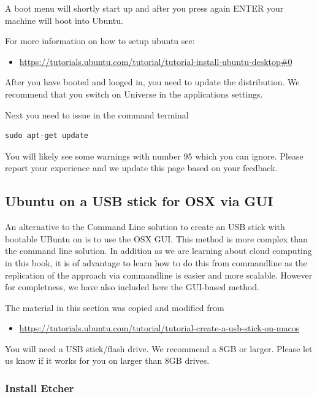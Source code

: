 A boot menu will shortly start up and after you press again ENTER your
machine will boot into Ubuntu.

For more information on how to setup ubuntu see:

\begin{itemize}
\item
  \url{https://tutorials.ubuntu.com/tutorial/tutorial-install-ubuntu-desktop\#0}
\end{itemize}

After you have booted and looged in, you need to update the
distribution. We recommend that you switch on Universe in the
applications settings.

Next you need to issue in the command terminal

\begin{lstlisting}
sudo apt-get update
\end{lstlisting}

You will likely see some warnings with number 95 which you can ignore.
Please report your experience and we update this page based on your
feedback.

\subsection{Ubuntu on a USB stick for OSX via GUI}

An alternative to the Command Line solution to create an USB stick with
bootable UBuntu on is to use the OSX GUI. This method is more complex
than the command line solution. In addition as we are learning about
cloud computing in this book, it is of advantage to learn how to do this
from commandline as the replication of the approach via commandline is
easier and more scalable. However for completness, we have also included
here the GUI-based method.

The material in this section was copied and modified from

\begin{itemize}
\item
  \url{https://tutorials.ubuntu.com/tutorial/tutorial-create-a-usb-stick-on-macos}
\end{itemize}

You will need a USB stick/flash drive. We recommend a 8GB or larger.
Please let us know if it works for you on larger than 8GB drives.

\subsubsection{Install Etcher}

